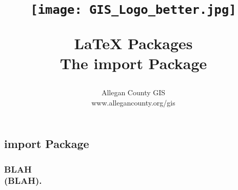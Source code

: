 \documentclass[class=book , crop=false]{standalone}
\title{ %
\HRule %
\\[.4cm] %
\begin{figure}[H] %
\begin{center}	%
\texttt{[image: GIS\_Logo\_better.jpg]}
\end{center}
\end{figure}
\Huge \bfseries \LaTeX{} Packages\\ \medskip\large The import Package %
\HRule \\[.4cm] %
} %
\author{\Large Allegan County GIS \\\Large www.allegancounty.org/gis} %
\begin{document}
\ifstandalone
\maketitle %
\tableofcontents %
\clearpage
\fi

\subsection{import Package}
\medskip
\subsubsection{\Large BLAH \\\small(BLAH).}
\end{document}
